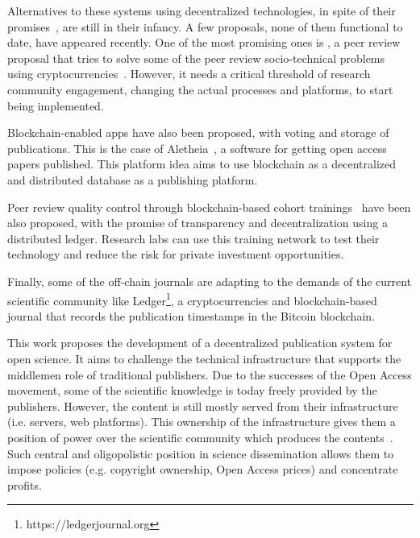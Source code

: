 Alternatives to these systems using decentralized technologies, in spite of
their promises~\cite{bartlingblockchain}, are still in their infancy. A few
proposals, none of them functional to date, have appeared recently. One of the
most promising ones is , a peer review proposal that tries to solve
some of the peer review socio-technical problems using
cryptocurrencies~\cite{tennant2017multi}. However, it needs a critical threshold
of research community engagement, changing the actual processes and platforms,
to start being implemented.

Blockchain-enabled apps have also been proposed, with voting and storage of
publications. This is the case of Aletheia~\cite{morton2017aletheia}, a software
for getting open access papers published. This platform idea aims to use
blockchain as a decentralized and distributed database as a publishing platform.

Peer review quality control through blockchain-based cohort
trainings~\cite{dhillon2016bench} have been also proposed, with the promise of
transparency and decentralization using a distributed ledger. Research labs can
use this training network to test their technology and reduce the risk for
private investment opportunities.

Finally, some of the off-chain journals are adapting to the demands of the
current scientific community like Ledger\footnote{https://ledgerjournal.org}, a
cryptocurrencies and blockchain-based journal that records the publication
timestamps in the Bitcoin blockchain.

This work proposes the development of a decentralized publication system for
open science. It aims to challenge the technical infrastructure that supports
the middlemen role of traditional publishers. Due to the successes of the Open
Access movement, some of the scientific knowledge is today freely provided by
the publishers. However, the content is still mostly served from their
infrastructure (i.e. servers, web platforms). This ownership of the
infrastructure gives them a position of power over the scientific community
which produces the contents~\cite{fuster2010governance}. Such central and
oligopolistic position in science dissemination allows them to impose policies
(e.g. copyright ownership, Open Access prices) and concentrate profits.


